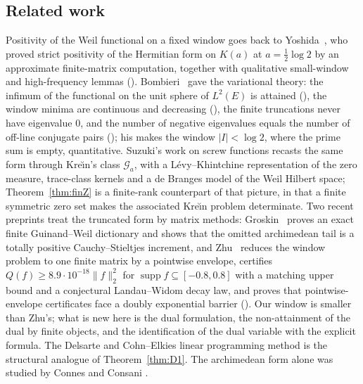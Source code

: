 \documentclass[11pt]{amsart}
\theoremstyle{definition}
\theoremstyle{remark}
\newcommand{\supp}{\operatorname{supp}}
\begin{document}
\subsection{Related work}\label{subsec:related}
Positivity of the Weil functional on a fixed window goes back to Yoshida~\cite{Yoshida1992}, who
proved strict positivity of the Hermitian form on $K(a)$ at $a=\tfrac12\log 2$ by an approximate
finite-matrix computation, together with qualitative small-window and high-frequency lemmas
(\cite[Lemmas~2--3]{Yoshida1992}). Bombieri~\cite{Bombieri2000} gave the variational theory: the
infimum of the functional on the unit sphere of $L^2(E)$ is attained (\cite[Thm.~3]{Bombieri2000}),
the window minima are continuous and decreasing (\cite[Thm.~5]{Bombieri2000}), the finite
truncations never have eigenvalue $0$, and the number of negative eigenvalues equals the number of
off-line conjugate pairs (\cite[Thm.~8]{Bombieri2000}); his \cite[Thm.~12]{Bombieri2000} makes the
window $|I|<\log 2$, where the prime sum is empty, quantitative. Suzuki's work on screw functions
\cite{Suzuki2023jlms,Suzuki2023screwline,Suzuki2025hilbert} recasts the same form through Kre\u{\i}n's
class $\mathcal G_a$, with a L\'evy--Khintchine representation of the zero measure, trace-class kernels
and a de Branges model of the Weil Hilbert space; Theorem~\ref{thm:finZ} is a finite-rank counterpart
of that picture, in that a finite symmetric zero set makes the associated Kre\u{\i}n problem
determinate. Two recent preprints treat the truncated form by matrix methods: Groskin~\cite{Groskin2026}
proves an exact finite Guinand--Weil dictionary and shows that the omitted archimedean tail is a totally
positive Cauchy--Stieltjes increment, and Zhu~\cite{Zhu2026} reduces the window problem to one finite
matrix by a pointwise envelope, certifies $Q(f)\ge 8.9\cdot 10^{-18}\|f\|_2^2$ for
$\supp f\subseteq[-0.8,0.8]$ with a matching upper bound and a conjectural Landau--Widom decay law, and
proves that pointwise-envelope certificates face a doubly exponential barrier (\cite[Thm.~1.4]{Zhu2026}).
Our window is smaller than Zhu's; what is new here is the dual formulation, the non-attainment of the
dual by finite objects, and the identification of the dual variable with the explicit formula. The
Delsarte and Cohn--Elkies linear programming method \cite{CohnElkies2003} is the structural analogue
of Theorem~\ref{thm:D1}. The archimedean form alone was studied by Connes and Consani
\cite{ConnesConsani2021}.
\end{document}
